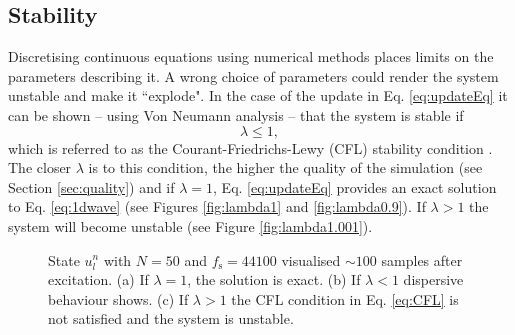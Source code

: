 \subsection{Stability}\label{sec:stability}
Discretising continuous equations using numerical methods places limits on the parameters describing it. A wrong choice of parameters could render the system unstable and make it ``explode". In the case of the update in Eq. \eqref{eq:updateEq} it can be shown -- using Von Neumann analysis -- that the system is stable if
\begin{equation}\label{eq:CFL}
    \lambda \leq 1,
\end{equation}
which is referred to as the Courant-Friedrichs-Lewy (CFL) stability condition \cite{Strikwerda1989}. The closer $\lambda$ is to this condition, the higher the quality of the simulation (see Section \ref{sec:quality}) and if $\lambda = 1$, Eq. \eqref{eq:updateEq} provides an exact solution to Eq. \eqref{eq:1dwave} %
(see Figures \ref{fig:lambda1} and \ref{fig:lambda0.9}). If $\lambda > 1$ the system will become unstable (see Figure \ref{fig:lambda1.001}).
\begin{figure}[ht]
    \centering
    \caption{State $u_l^n$ with $N = 50$ and $f_\text{s} = 44100$ visualised $\sim\!100$ samples after excitation. (a) If $\lambda = 1$, the solution is exact. (b) If $\lambda < 1$ dispersive behaviour shows. (c) If $\lambda > 1$ the CFL condition in Eq. \eqref{eq:CFL} is not satisfied and the system is unstable.
    \label{fig:dispersion}}
\end{figure}

